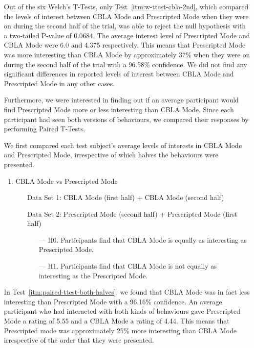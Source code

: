 Out of the six Welch's T-Tests, only Test~\ref{itm:w-ttest-cbla-2nd}, which compared the levels of interest between CBLA Mode and Prescripted Mode when they were on during the second half of the trial, was able to reject the null hypothesis with a two-tailed P-value of 0.0684. The average interest level of Prescripted Mode and CBLA Mode were 6.0 and 4.375 respectively. This means that Prescripted Mode was more interesting than CBLA Mode by approximately 37\% when they were on during the second half of the trial with a 96.58\% confidence. We did not find any significant differences in reported levels of interest between CBLA Mode and Prescripted Mode in any other cases.

Furthermore, we were interested in finding out if an average participant would find Prescripted Mode more or less interesting than CBLA Mode. Since each participant had seen both versions of behaviours, we compared their responses by performing Paired T-Tests. 

We first compared each test subject's average levels of interests in CBLA Mode and Prescripted Mode, irrespective of which halves the behaviours were presented. 
\begin{enumerate}[resume]
 	\item CBLA Mode vs Prescripted Mode
 	\begin{itemize}[align=left]\label{itm:paired-ttest-both-halves}
 		\item[Data Set 1: ]  CBLA Mode (first half) + CBLA Mode (second half)
 		\item[Data Set 2: ]  Prescripted Mode (second half) + Prescripted Mode (first half) 
 		\begin{itemize}
 			\item[--- H0.] Participants find that CBLA Mode is equally as interesting as Prescripted Mode.
 			\item[--- H1.] Participants find that CBLA Mode is not equally as interesting as the Prescripted Mode.
 		\end{itemize}
 	\end{itemize}
\end{enumerate}

In Test~\ref{itm:paired-ttest-both-halves}, we found that CBLA Mode was in fact less interesting than Prescripted Mode with a 96.16\% confidence. An average participant who had interacted with both kinds of behaviours gave Prescripted Mode a rating of 5.55 and a CBLA Mode a rating of 4.44. This means that Prescripted mode was approximately 25\% more interesting than CBLA Mode irrespective of the order that they were presented. 

